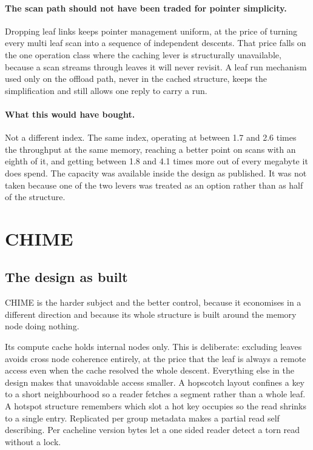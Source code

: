 \documentclass[sigconf,nonacm]{acmart}
\begin{document}
\paragraph{The scan path should not have been traded for pointer simplicity.}
Dropping leaf links keeps pointer management uniform, at the price of turning
every multi leaf scan into a sequence of independent descents. That price falls
on the one operation class where the caching lever is structurally unavailable,
because a scan streams through leaves it will never revisit. A leaf run mechanism
used only on the offload path, never in the cached structure, keeps the
simplification and still allows one reply to carry a run.

\paragraph{What this would have bought.}
Not a different index. The same index, operating at between 1.7 and 2.6 times the
throughput at the same memory, reaching a better point on scans with an eighth of
it, and getting between 1.8 and 4.1 times more out of every megabyte it does
spend. The capacity was available inside the design as published. It was not
taken because one of the two levers was treated as an option rather than as half
of the structure.

\section{CHIME}
\label{sec:chime}

\subsection{The design as built}

CHIME is the harder subject and the better control, because it economises in a
different direction and because its whole structure is built around the memory
node doing nothing.

Its compute cache holds internal nodes only. This is deliberate: excluding leaves
avoids cross node coherence entirely, at the price that the leaf is always a
remote access even when the cache resolved the whole descent. Everything else in
the design makes that unavoidable access smaller. A hopscotch layout confines a
key to a short neighbourhood so a reader fetches a segment rather than a whole
leaf. A hotspot structure remembers which slot a hot key occupies so the read
shrinks to a single entry. Replicated per group metadata makes a partial read self
describing. Per cacheline version bytes let a one sided reader detect a torn read
without a lock.
\end{document}
